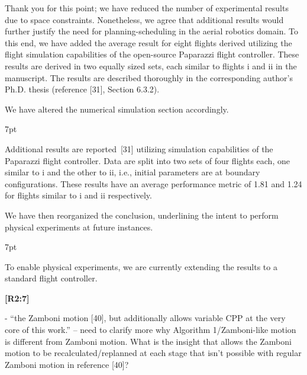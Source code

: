 \documentclass[10pt]{letter}
\newenvironment{formal}{%
  \def\FrameCommand{%
    \hspace{1pt}%
    {\color{red}\vrule width 2pt}%
    {\color{formalshade}\vrule width 4pt}%
    \colorbox{formalshade}%
  }%
  \MakeFramed{\advance\hsize-\width\FrameRestore}%
  \noindent\hspace{-4.55pt}%
  \begin{adjustwidth}{}{7pt}%
  \vspace{2pt}\vspace{2pt}%
}
{%
  \vspace{2pt}\end{adjustwidth}\endMakeFramed%
}
\begin{document}
  {\color{blue} 
  
  {\hspace*{-4.5em}{[R2:6]}\vspace*{-1.9em}}

  Thank you for this point; we have reduced the number of experimental results due to space constraints. Nonetheless, we agree that additional results would further justify the need for planning-scheduling in the aerial robotics domain. To this end, we have added the average result for eight flights derived utilizing the flight simulation capabilities of the open-source Paparazzi flight controller. These results are derived in two equally sized sets, each similar to flights i and ii in the manuscript. The results are described thoroughly in the corresponding author's Ph.D. thesis (reference [{\color{green}31}], Section 6.3.2).
  
  We have altered the numerical simulation section accordingly.

  \begin{formal}
    {\color{blue}
    Additional results are reported~[{\color{green}31}] utilizing simulation capabilities of the Paparazzi flight controller. Data are split into two sets of four flights each, one similar to {\color{red}i} and the other to {\color{red}ii}, i.e., initial parameters are at boundary configurations.
    These results have an average performance metric of 1.81 and 1.24 for flights similar to {\color{red}i} and {\color{red}ii} respectively.}    

    \vspace*{1ex}
  \end{formal}

  We have then reorganized the conclusion, underlining the intent to perform physical experiments at future instances.
  
  \begin{formal}
  \color{black}
  {\color{blue}To enable physical experiments}, we are currently extending the results to a standard flight controller.
  \end{formal}
  }

{\hspace*{-4.5em}\textbf{[R2:7]}\vspace*{-1.9em}}

- ``the Zamboni motion [40], but additionally allows variable CPP at the very core of this work.'' -- need to clarify more why Algorithm 1/Zamboni-like motion is different from Zamboni motion. What is the   insight that allows the Zamboni motion to be recalculated/replanned at each stage that isn't possible with regular Zamboni motion in reference [40]? 
\end{document}
